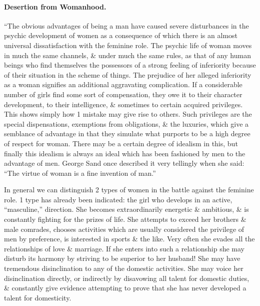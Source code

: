\documentclass{article}
\begin{document}
\paragraph{Desertion from Womanhood.} ``The obvious advantages of being a man have caused severe disturbances in the psychic development of women as a consequence of which there is an almost universal dissatisfaction with the feminine role. The psychic life of woman moves in much the same channels, \& under much the same rules, as that of any human beings who find themselves the possessors of a strong feeling of inferiority because of their situation in the scheme of things. The prejudice of her alleged inferiority as a woman signifies an additional aggravating complication. If a considerable number of girls find some sort of compensation, they owe it to their character development, to their intelligence, \& sometimes to certain acquired privileges. This shows simply how 1 mistake may give rise to others. Such privileges are the special dispensations, exemptions from obligations, \& the luxuries, which give a semblance of advantage in that they simulate what purports to be a high degree of respect for woman. There may be a certain degree of idealism in this, but finally this idealism is always an ideal which has been fashioned by men to the advantage of men. George Sand once described it very tellingly when she said: ``The virtue of woman is a fine invention of man.''

In general we can distinguish 2 types of women in the battle against the feminine role. 1 type has already been indicated: the girl who develops in an active, ``masculine,'' direction. She becomes extraordinarily energetic \& ambitious, \& is constantly fighting for the prizes of life. She attempts to exceed her brothers \& male comrades, chooses activities which are usually considered the privilege of men by preference, is interested in sports \& the like. Very often she evades all the relationships of love \& marriage. If she enters into such a relationship she may disturb its harmony by striving to be superior to her husband! She may have tremendous disinclination to any of the domestic activities. She may voice her disinclination directly, or indirectly by disavowing all talent for domestic duties, \& constantly give evidence attempting to prove that she has never developed a talent for domesticity.
\end{document}
